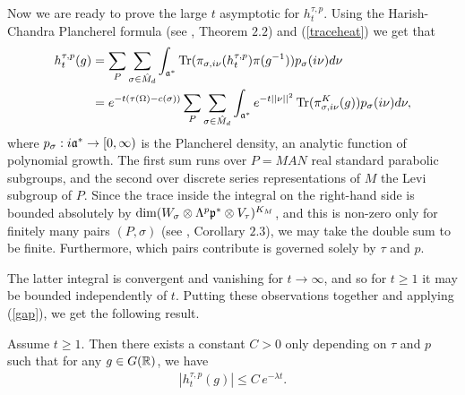 \noindent Now we are ready to prove the large $t$ asymptotic for $h_t^{\tau,p}$. Using the Harish-Chandra Plancherel formula (see \cite{Olbrich}, Theorem $2.2$) and (\ref{traceheat}) we get that
\begin{align*}
    h_t^{\tau,p}(g) &= \sum_P\sum_{\sigma\in \hat{M}_d}\int_{\mathfrak{a}^*}\operatorname{Tr}(\pi_{\sigma,i\nu}(h_t^{\tau,p})\pi(g^{-1}))p_\sigma(i\nu) d\nu \\
    &=e^{-t(\tau(\Omega)-c(\sigma))}\sum_P\sum_{\sigma\in \hat{M}_d}\int_{\mathfrak{a}^*} e^{-t||\nu||^2}\operatorname{Tr}(\pi_{\sigma,i\nu}^K(g))p_\sigma(i\nu) d\nu,
\end{align*}
where $p_\sigma:i\mathfrak{a}^*\to [0,\infty)$ is the Plancherel density, an analytic function of polynomial growth. The first sum runs over $P=MAN$ real standard parabolic subgroups, and the second over discrete series representations of $M$ the Levi subgroup of $P$. Since the trace inside the integral on the right-hand side is bounded absolutely by $\operatorname{dim}(W_\sigma\otimes \Lambda^p\mathfrak{p}^*\otimes V_\tau)^{K_M}$, and this is non-zero only for finitely many pairs $(P,\sigma)$ (see \cite{Olbrich}, Corollary $2.3$), we may take the double sum to be finite. Furthermore, which pairs contribute is governed solely by $\tau$ and $p$. 

The latter integral is convergent and vanishing for $t\to\infty$, and so for $t\geq 1$ it may be bounded independently of $t$. Putting these observations together and applying (\ref{gap}), we get the following result.
\begin{prop}\label{traceheatdecay}
    Assume $t\geq 1$. Then there exists a constant $C>0$ only depending on $\tau$ and $p$ such that for any $g\in G(\mathbb{R})$, we have
    \begin{align*}
        | h_t^{\tau,p}(g)|\leq C\,e^{-\lambda t}.
    \end{align*}
\end{prop}

